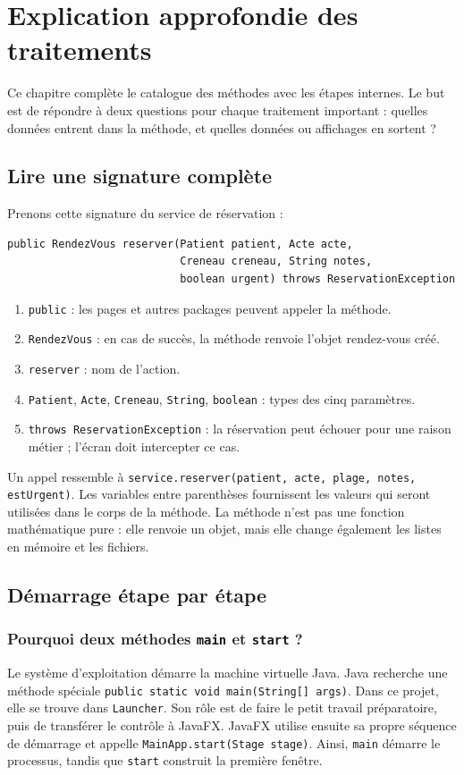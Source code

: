 \documentclass[11pt,a4paper]{report}
\begin{document}
\chapter{Explication approfondie des traitements}
Ce chapitre complète le catalogue des méthodes avec les étapes internes. Le but est de répondre à deux questions pour chaque traitement important : quelles données entrent dans la méthode, et quelles données ou affichages en sortent ?

\section{Lire une signature complète}
Prenons cette signature du service de réservation :
\begin{lstlisting}
public RendezVous reserver(Patient patient, Acte acte,
                           Creneau creneau, String notes,
                           boolean urgent) throws ReservationException
\end{lstlisting}
\begin{enumerate}
\item \texttt{public} : les pages et autres packages peuvent appeler la méthode.
\item \texttt{RendezVous} : en cas de succès, la méthode renvoie l'objet rendez-vous créé.
\item \texttt{reserver} : nom de l'action.
\item \texttt{Patient}, \texttt{Acte}, \texttt{Creneau}, \texttt{String}, \texttt{boolean} : types des cinq paramètres.
\item \texttt{throws ReservationException} : la réservation peut échouer pour une raison métier ; l'écran doit intercepter ce cas.
\end{enumerate}
Un appel ressemble à \texttt{service.reserver(patient, acte, plage, notes, estUrgent)}. Les variables entre parenthèses fournissent les valeurs qui seront utilisées dans le corps de la méthode. La méthode n'est pas une fonction mathématique pure : elle renvoie un objet, mais elle change également les listes en mémoire et les fichiers.

\section{Démarrage étape par étape}
\subsection{Pourquoi deux méthodes \texttt{main} et \texttt{start} ?}
Le système d'exploitation démarre la machine virtuelle Java. Java recherche une méthode spéciale \texttt{public static void main(String[] args)}. Dans ce projet, elle se trouve dans \texttt{Launcher}. Son rôle est de faire le petit travail préparatoire, puis de transférer le contrôle à JavaFX. JavaFX utilise ensuite sa propre séquence de démarrage et appelle \texttt{MainApp.start(Stage stage)}. Ainsi, \texttt{main} démarre le processus, tandis que \texttt{start} construit la première fenêtre.
\end{document}
